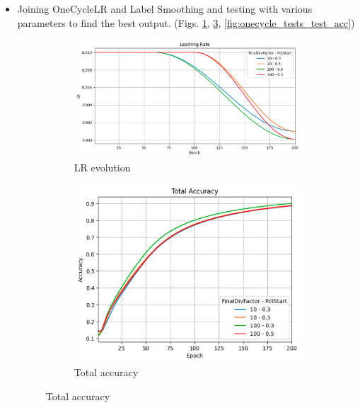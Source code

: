 \documentclass[11pt, a4paper, oneside]{assets/tex/thesis} %
\begin{document}
{\begin{itemize}
    \item Joining OneCycleLR and Label Smoothing and testing with various parameters to find the best output. (Figs. \ref{fig:onecycle_tests_lr}, \ref{fig:onecycle_tests_train_acc}, \ref{fig:onecycle_tests_test_acc})

    \begin{figure}[h]
        \centering
        \begin{subfigure}[b]{0.3\textwidth}
            \centering
            \includegraphics[width=\textwidth]{assets/img/onecycle_tests_lr.png}
            \caption{LR evolution}
            \label{fig:onecycle_tests_lr}
        \end{subfigure}%
        \hfill
        \begin{subfigure}[b]{0.3\textwidth}
            \centering
            \includegraphics[width=\textwidth]{assets/img/onecycle_tests_train_acc.png}
            \caption{Total accuracy}
            \label{fig:onecycle_tests_train_acc}

\end{subfigure}
\end{figure}
\end{itemize}}
\end{document}
